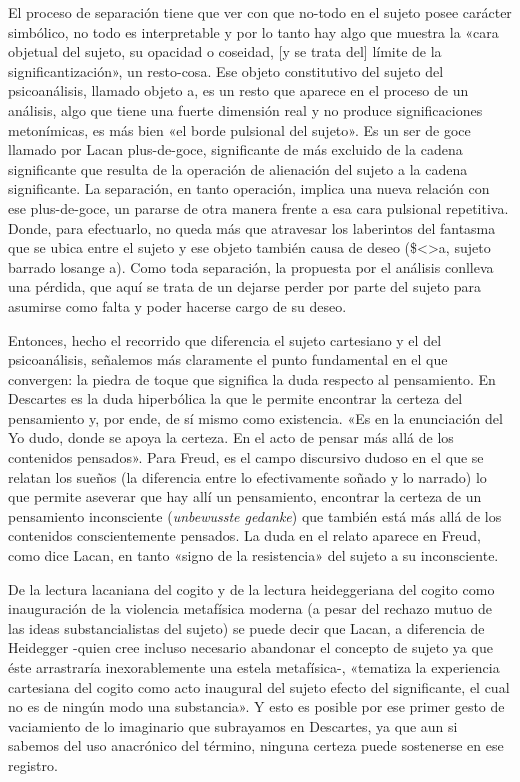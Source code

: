 El proceso de separación tiene que ver con que no-todo en el sujeto posee carácter simbólico, no todo es interpretable y por lo tanto hay algo que muestra la «cara objetual del sujeto, su opacidad o coseidad, {[}y se trata del{]} límite de la significantización», un resto-cosa. Ese objeto constitutivo del sujeto del psicoanálisis, llamado objeto a, es un resto que aparece en el proceso de un análisis, algo que tiene una fuerte dimensión real y no produce significaciones metonímicas, es más bien «el borde pulsional del sujeto». Es un ser de goce llamado por Lacan plus-de-goce, significante de más excluido de la cadena significante que resulta de la operación de alienación del sujeto a la cadena significante. La separación, en tanto operación, implica una nueva relación con ese plus-de-goce, un pararse de otra manera frente a esa cara pulsional repetitiva. Donde, para efectuarlo, no queda más que atravesar los laberintos del fantasma que se ubica entre el sujeto y ese objeto también causa de deseo (\$\textless\textgreater a, sujeto barrado losange a). Como toda separación, la propuesta por el análisis conlleva una pérdida, que aquí se trata de un dejarse perder por parte del sujeto para asumirse como falta y poder hacerse cargo de su deseo.

Entonces, hecho el recorrido que diferencia el sujeto cartesiano y el del psicoanálisis, señalemos más claramente el punto fundamental en el que convergen: la piedra de toque que significa la duda respecto al pensamiento. En Descartes es la duda hiperbólica la que le permite encontrar la certeza del pensamiento y, por ende, de sí mismo como existencia. «Es en la enunciación del Yo dudo, donde se apoya la certeza. En el acto de pensar más allá de los contenidos pensados». Para Freud, es el campo discursivo dudoso en el que se relatan los sueños (la diferencia entre lo efectivamente soñado y lo narrado) lo que permite aseverar que hay allí un pensamiento, encontrar la certeza de un pensamiento inconsciente (\emph{unbewusste gedanke}) que también está más allá de los contenidos conscientemente pensados. La duda en el relato aparece en Freud, como dice Lacan, en tanto «signo de la resistencia» del sujeto a su inconsciente.

De la lectura lacaniana del cogito y de la lectura heideggeriana del cogito como inauguración de la violencia metafísica moderna (a pesar del rechazo mutuo de las ideas substancialistas del sujeto) se puede decir que Lacan, a diferencia de Heidegger -quien cree incluso necesario abandonar el concepto de sujeto ya que éste arrastraría inexorablemente una estela metafísica-, «tematiza la experiencia cartesiana del cogito como acto inaugural del sujeto efecto del significante, el cual no es de ningún modo una substancia». Y esto es posible por ese primer gesto de vaciamiento de lo imaginario que subrayamos en Descartes, ya que aun si sabemos del uso anacrónico del término, ninguna certeza puede sostenerse en ese registro.

